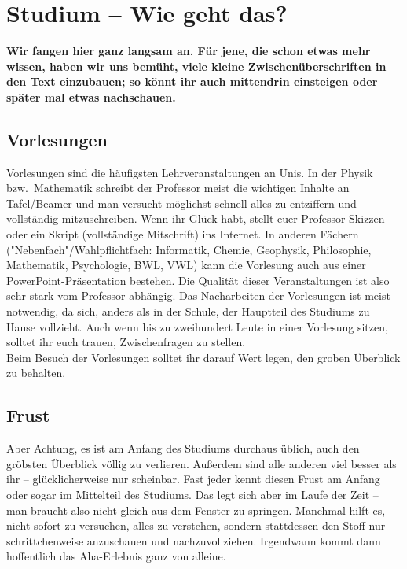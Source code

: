 \section{Studium -- Wie geht das?}
\begin{multicols}{2}
\renewcommand{\fibelsubsectionpre}{\fibelsubsubsectionpre}
\renewcommand{\fibelsubsectionpost}{\fibelsubsubsectionpost}

\textbf{Wir fangen hier ganz langsam an. Für jene, die schon etwas mehr wissen, haben wir uns bemüht, viele kleine Zwischenüberschriften in den Text einzubauen; so könnt ihr auch mittendrin einsteigen oder später mal etwas nachschauen.}

\subsection*{Vorlesungen}
Vorlesungen sind die häufigsten Lehrveranstaltungen an Unis. In der Physik bzw.\ Mathematik schreibt der Professor meist die wichtigen Inhalte an Tafel/Beamer und man versucht möglichst schnell alles zu entziffern und vollständig mitzuschreiben. Wenn ihr Glück habt, stellt euer Professor Skizzen oder ein Skript (vollständige Mitschrift) ins Internet. In anderen Fächern ("Nebenfach"/Wahlpflichtfach: Informatik, Chemie, Geophysik, Philosophie, Mathematik, Psychologie, BWL, VWL) kann die Vorlesung auch aus einer PowerPoint-Präsentation bestehen. Die Qualität dieser Veranstaltungen ist also sehr stark vom Professor abhängig. Das Nacharbeiten der Vorlesungen ist meist notwendig, da sich, anders als in der Schule, der Hauptteil des Studiums zu Hause vollzieht. Auch wenn bis zu zweihundert Leute in einer Vorlesung sitzen, solltet ihr euch trauen, Zwischenfragen zu stellen.\\
Beim Besuch der Vorlesungen solltet ihr darauf Wert legen, den groben Überblick zu behalten.

\subsection*{Frust}
Aber Achtung, es ist am Anfang des Studiums durchaus üblich, auch den gröbsten Überblick völlig zu verlieren. Außerdem sind alle anderen viel besser als ihr -- glücklicherweise nur scheinbar. Fast jeder kennt diesen Frust am Anfang oder sogar im Mittelteil des Studiums. Das legt sich aber im Laufe der Zeit -- man braucht also nicht gleich aus dem Fenster zu springen. Manchmal hilft es, nicht sofort zu versuchen, alles zu verstehen, sondern stattdessen den Stoff nur schrittchenweise anzuschauen und nachzuvollziehen. Irgendwann kommt dann hoffentlich das Aha-Erlebnis ganz von alleine.


\end{multicols}
